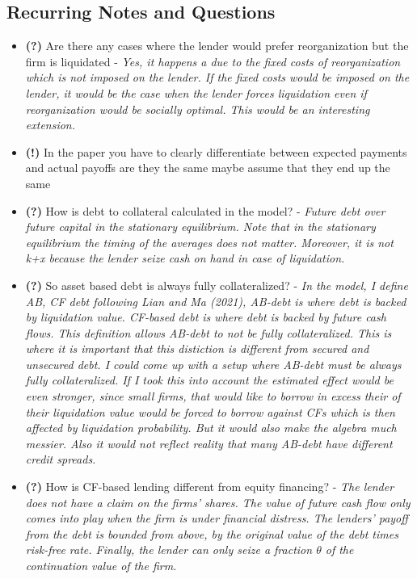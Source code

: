 \documentclass[12pt]{article}
\begin{document}
\subsection*{Recurring Notes and Questions}
\begin{itemize} \setlength\itemsep{0em}  \small
    \item \textbf{(?)} Are there any cases where the lender would prefer reorganization but the firm is liquidated - \textit{Yes, it happens a due to the fixed costs of reorganization which is not imposed on the lender. If the fixed costs would be imposed on the lender, it would be the case when the lender forces liquidation even if reorganization would be socially optimal. This would be an interesting extension.}
    \item \textbf{(!)} In the paper you have to clearly differentiate between expected payments and actual payoffs are they the same maybe assume that they end up the same
    \item \textbf{(?)} How is debt to collateral calculated in the model? - \textit{Future debt over future capital in the stationary equilibrium. Note that in the stationary equilibrium the timing of the averages does not matter. Moreover, it is not k+x because the lender seize cash on hand in case of liquidation.}
    \item  \textbf{(?)} So asset based debt is always fully collateralized? - \textit{In the model, I define AB, CF debt following Lian and Ma (2021), AB-debt is where debt is backed by liquidation value. CF-based debt is where debt is backed by future cash flows. This definition allows AB-debt to not be fully collateralized. This is where it is important that this distiction is different from secured and unsecured debt. I could come up with a setup where AB-debt must be always fully collateralized. If I took this into account the estimated effect would be even stronger, since small firms, that would like to borrow in excess their of their liquidation value would be forced to borrow against CFs which is then affected by liquidation probability. But it would also make the algebra much messier. Also it would not reflect reality that many AB-debt have different credit spreads.}
    \item \textbf{(?)} How is CF-based lending different from equity financing? - \textit{The lender does not have a claim on the firms' shares. The value of future cash flow only comes into play when the firm is under financial distress. The lenders' payoff from the debt is bounded from above, by the original value of the debt times risk-free rate. Finally, the lender can only seize a fraction $\theta$ of the continuation value of the firm.} 

\end{itemize}
\end{document}
